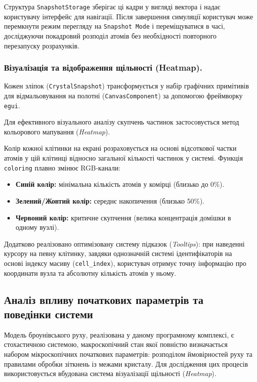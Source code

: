 \documentclass[14pt, a4paper]{extreport}
\begin{document}
	Структура \texttt{SnapshotStorage} зберігає ці кадри у вигляді вектора і надає користувачу інтерфейс для навігації. Після завершення симуляції користувач може перемкнути режим перегляду на \texttt{Snapshot Mode} і переміщуватися в часі, досліджуючи покадровий розподіл атомів без необхідності повторного перезапуску розрахунків.
	
	\subsubsection{Візуалізація та відображення щільності (Heatmap).}
	
	Кожен зліпок (\texttt{CrystalSnapshot}) трансформується у набір графічних примітивів для відмальовування на полотні (\texttt{CanvasComponent}) за допомогою фреймворку \texttt{egui}.
	
	Для ефективного візуального аналізу скупчень частинок застосовується метод кольорового мапування (\textit{Heatmap}).
	
	Колір кожної клітинки на екрані розраховується на основі відсоткової частки атомів у цій клітинці відносно загальної кількості частинок у системі. Функція \texttt{coloring} плавно змінює RGB-канали:
	\begin{itemize}
		\item \textbf{Синій колір:} мінімальна кількість атомів у комірці (близько до 0\%).
		\item \textbf{Зелений/Жовтий колір:} середнє накопичення (близько 50\%).
		\item \textbf{Червоний колір:} критичне скупчення (велика концентрація домішки в одному вузлі).
	\end{itemize}
	
	Додатково реалізовано оптимізовану систему підказок (\textit{Tooltips}): при наведенні курсору на певну клітинку, завдяки однозначній системі ідентифікаторів на основі індексу масиву (\texttt{cell\_index}), користувач отримує точну інформацію про координати вузла та абсолютну кількість атомів у ньому.
	
	\subsection{Аналіз впливу початкових параметрів та поведінки системи}
	
	Модель броунівського руху, реалізована у даному програмному комплексі, є стохастичною системою, макроскопічний стан якої повністю визначається набором мікроскопічних початкових параметрів: розподілом ймовірностей руху та правилами обробки зіткнень із межами кристалу. Для дослідження цих процесів використовується вбудована система візуалізації щільності (\textit{Heatmap}).
	
\end{document}

